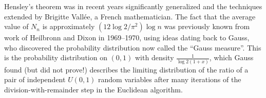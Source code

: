 \noindent Hensley's theorem was in recent years significantly
generalized and the techniques extended by Brigitte
Vallée, a French mathematician. The fact that the
average value of $N_n$ is approximately
$(12\log 2/\pi^2)\log n$ was previously known from
work of Heilbronn and Dixon in 1969--1970, using ideas
dating back to Gauss, who discovered the probability
distribution now called the ``Gauss measure''. This is
the probability distribution on $(0,1)$ with density
$\frac{1}{\log 2(1+x)}$, which Gauss found (but did
not prove!) describes the limiting distribution of the
ratio of a pair of independent $U(0,1)$ random
variables after many iterations of the
division-with-remainder step in the Euclidean
algorithm.
